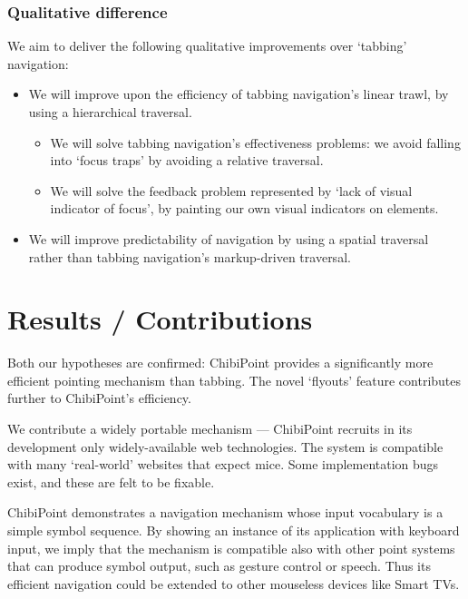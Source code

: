 \documentclass[a4paper, 12pt]{report}
\begin{document}
\subsubsection{Qualitative difference}
\label{sec:qualitative_promises}
We aim to deliver the following qualitative improvements over `tabbing' navigation:
\begin{itemize}
\item We will improve upon the efficiency of tabbing navigation's linear trawl, by using a hierarchical traversal.

\begin{itemize}
\item We will solve tabbing navigation's effectiveness problems: we avoid falling into `focus traps' by avoiding a relative traversal.
\item We will solve the feedback problem represented by `lack of visual indicator of focus', by painting our own visual indicators on elements.
\end{itemize}

\item We will improve predictability of navigation by using a spatial traversal rather than tabbing navigation's markup-driven traversal.
\end{itemize}

\section{Results / Contributions}
Both our hypotheses are confirmed: ChibiPoint provides a significantly more efficient pointing mechanism than tabbing. The novel `flyouts' feature contributes further to ChibiPoint's efficiency.

We contribute a widely portable mechanism --- ChibiPoint recruits in its development only widely-available web technologies. The system is compatible with many `real-world' websites that expect mice. Some implementation bugs exist, and these are felt to be fixable.

ChibiPoint demonstrates a navigation mechanism whose input vocabulary is a simple symbol sequence. By showing an instance of its application with keyboard input, we imply that the mechanism is compatible also with other point systems that can produce symbol output, such as gesture control or speech. Thus its efficient navigation could be extended to other mouseless devices like Smart TVs.
\end{document}
